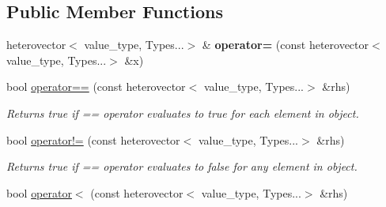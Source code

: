 \subsection*{Public Member Functions}
\begin{DoxyCompactItemize}
\item 
\hypertarget{classheterogeneous_1_1heterovector_3_01_t_00_01_u_00_01_types_8_8_8_4_adbd9c999caec73e5d41dfcfaa8213057}{}heterovector$<$ value\+\_\+type, Types...$>$ \& {\bfseries operator=} (const heterovector$<$ value\+\_\+type, Types...$>$ \&x)\label{classheterogeneous_1_1heterovector_3_01_t_00_01_u_00_01_types_8_8_8_4_adbd9c999caec73e5d41dfcfaa8213057}

\item 
\hypertarget{classheterogeneous_1_1heterovector_3_01_t_00_01_u_00_01_types_8_8_8_4_a08bb4b6fc1cc8e78a5f815edcfed8bc9}{}bool \hyperlink{classheterogeneous_1_1heterovector_3_01_t_00_01_u_00_01_types_8_8_8_4_a08bb4b6fc1cc8e78a5f815edcfed8bc9}{operator==} (const heterovector$<$ value\+\_\+type, Types...$>$ \&rhs)\label{classheterogeneous_1_1heterovector_3_01_t_00_01_u_00_01_types_8_8_8_4_a08bb4b6fc1cc8e78a5f815edcfed8bc9}

\begin{DoxyCompactList}\small\item\em Returns true if == operator evaluates to true for each element in object. \end{DoxyCompactList}\item 
\hypertarget{classheterogeneous_1_1heterovector_3_01_t_00_01_u_00_01_types_8_8_8_4_af47480a415ffd0da4318f2e138cc8ab7}{}bool \hyperlink{classheterogeneous_1_1heterovector_3_01_t_00_01_u_00_01_types_8_8_8_4_af47480a415ffd0da4318f2e138cc8ab7}{operator!=} (const heterovector$<$ value\+\_\+type, Types...$>$ \&rhs)\label{classheterogeneous_1_1heterovector_3_01_t_00_01_u_00_01_types_8_8_8_4_af47480a415ffd0da4318f2e138cc8ab7}

\begin{DoxyCompactList}\small\item\em Returns true if == operator evaluates to false for any element in object. \end{DoxyCompactList}\item 
\hypertarget{classheterogeneous_1_1heterovector_3_01_t_00_01_u_00_01_types_8_8_8_4_a9ca312236d698aca99aa4dfbfabfc3f3}{}bool \hyperlink{classheterogeneous_1_1heterovector_3_01_t_00_01_u_00_01_types_8_8_8_4_a9ca312236d698aca99aa4dfbfabfc3f3}{operator$<$} (const heterovector$<$ value\+\_\+type, Types...$>$ \&rhs)\label{classheterogeneous_1_1heterovector_3_01_t_00_01_u_00_01_types_8_8_8_4_a9ca312236d698aca99aa4dfbfabfc3f3}


\end{DoxyCompactItemize}
